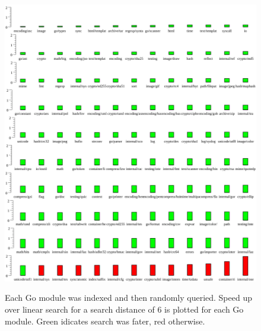 \begin{figure}
    \includegraphics[width=\textwidth]{example6.png}
    \label{dist6plot}
    \centering
    \caption{Each Go module was indexed and then randomly queried.
    Speed up over linear search for a search distance of $6$ is plotted for each Go module.
    Green idicates search was fater, red otherwise.}
\end{figure}